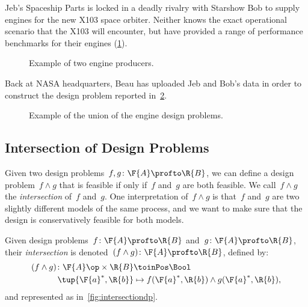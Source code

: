 \begin{example}
    Jeb's Spaceship Parts is locked in a deadly rivalry with Starshow Bob to supply engines for the new X103 space orbiter. Neither knows the exact operational scenario that the X103 will encounter, but have provided a range of performance benchmarks for their engines (\cref{fig:exunion_1}).
    \begin{figure}[h!]
        \begin{center}
        \end{center}
        \caption{Example of two engine producers. \label{fig:exunion_1}}
    \end{figure}
    Back at NASA headquarters, Beau has uploaded Jeb and Bob's data in order to construct the design problem reported in~\cref{fig:exunion_2}.
    \begin{figure}[h!]
        \begin{center}
        \end{center}
        \caption{Example of the union of the engine design problems. \label{fig:exunion_2}}
    \end{figure}
\end{example}

\subsection{Intersection of Design Problems}

Given two design problems~$f, g \colon \F{A} \profto \R{B}$, we can define a design problem~$f \wedge g$ that is feasible if only if~$f$ and~$g$ are both feasible. We call~$f \wedge g$ the \emph{intersection} of~$f$ and~$g$. One interpretation of~$f \wedge g$ is that~$f$ and~$g$ are two slightly different models of the same process, and we want to make sure that the design is conservatively feasible for both models.

\begin{definition}
    Given design problems~$f\colon \F{A} \profto \R{B}$ and~$g\colon \F{A} \profto \R{B}$,
    their \emph{intersection} is denoted~$(f \wedge g)\colon \F{A} \profto \R{B}$, defined by:
    \begin{equation}
        \begin{aligned}
        (f \wedge g)
            \colon \F{A}\op \times \R{B} & \toinPos \Bool \\
            \tup{\F{a}^*, \R{b}} & \mapsto f(\F{a}^*, \R{b}) \wedge  g(\F{a}^*, \R{b}),
        \end{aligned}
    \end{equation}
    and represented as in~\cref{fig:intersectiondp}.
\end{definition}

